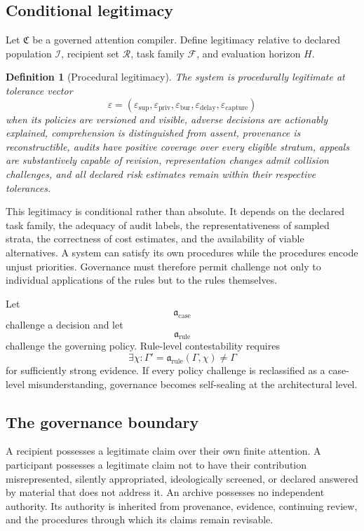\documentclass[11pt]{article}
\newtheorem{definition}{Definition}[section]
\theoremstyle{definition}
\newcommand{\eps}{\varepsilon}
\begin{document}
\subsection{Conditional legitimacy}

Let \(\mathfrak{C}\) be a governed attention compiler. Define legitimacy relative to declared population \(\mathcal{I}\), recipient set \(\mathcal{R}\), task family \(\mathcal{F}\), and evaluation horizon \(H\).

\begin{definition}[Procedural legitimacy]
The system is procedurally legitimate at tolerance vector
\[
\varepsilon
=
(\eps_{\mathrm{sup}},
\eps_{\mathrm{priv}},
\eps_{\mathrm{bur}},
\eps_{\mathrm{delay}},
\eps_{\mathrm{capture}})
\]
when its policies are versioned and visible, adverse decisions are actionably explained, comprehension is distinguished from assent, provenance is reconstructible, audits have positive coverage over every eligible stratum, appeals are substantively capable of revision, representation changes admit collision challenges, and all declared risk estimates remain within their respective tolerances.
\end{definition}

This legitimacy is conditional rather than absolute. It depends on the declared task family, the adequacy of audit labels, the representativeness of sampled strata, the correctness of cost estimates, and the availability of viable alternatives. A system can satisfy its own procedures while the procedures encode unjust priorities. Governance must therefore permit challenge not only to individual applications of the rules but to the rules themselves.

Let
\[
\mathfrak{a}_{\mathrm{case}}
\]
challenge a decision and let
\[
\mathfrak{a}_{\mathrm{rule}}
\]
challenge the governing policy. Rule-level contestability requires
\[
\exists\chi:
\Gamma'=
\mathfrak{a}_{\mathrm{rule}}(\Gamma,\chi)
\neq
\Gamma
\]
for sufficiently strong evidence. If every policy challenge is reclassified as a case-level misunderstanding, governance becomes self-sealing at the architectural level.

\subsection{The governance boundary}

A recipient possesses a legitimate claim over their own finite attention. A participant possesses a legitimate claim not to have their contribution misrepresented, silently appropriated, ideologically screened, or declared answered by material that does not address it. An archive possesses no independent authority. Its authority is inherited from provenance, evidence, continuing review, and the procedures through which its claims remain revisable.
\end{document}
